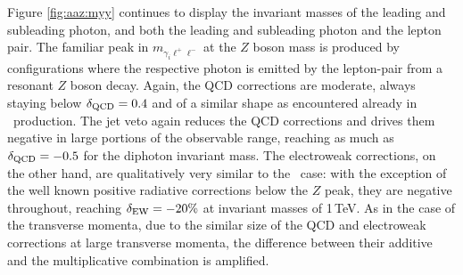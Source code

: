 Figure \ref{fig:aaz:myy} continues to display the invariant masses 
of the leading and subleading photon, and both the leading and 
subleading photon and the lepton pair. 
The familiar peak in $m_{\gamma_i\ell^+\ell^-}$ at the $Z$ boson mass 
is produced by 
configurations where the respective photon is emitted by the 
lepton-pair from a resonant $Z$ boson decay. 
Again, the QCD corrections are moderate, always staying below 
$\delta_\text{QCD}=0.4$ and of a similar shape as encountered already in 
\aaw\ production. 
The jet veto again reduces the QCD corrections and drives them negative 
in large portions of the observable range, reaching as much as 
$\delta_\text{QCD}=-0.5$ for the diphoton invariant mass. 
The electroweak corrections, on the other hand, are qualitatively very similar 
to the \aaw\ case: with the exception of the well known positive 
radiative corrections below the $Z$ peak, they are negative 
throughout, reaching $\delta_\text{EW}=-20\%$ at invariant masses of 
1\,TeV.
As in the case of the transverse momenta, due to the similar size 
of the QCD and electroweak corrections at large transverse 
momenta, the difference between their additive and the multiplicative 
combination is amplified.

